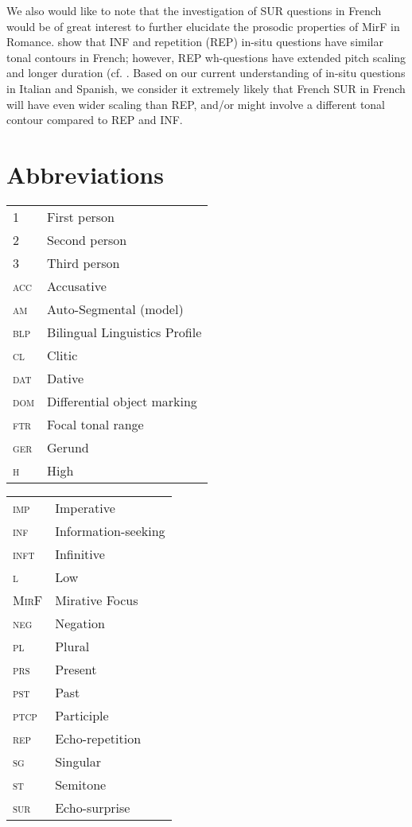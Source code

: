 \documentclass[output=paper,colorlinks,citecolor=brown,draftmode]{langscibook}
\begin{document}
We also would like to note that the investigation of SUR questions in French would be of great interest to further elucidate the prosodic properties of MirF in Romance. \citet{Glasbergen-PlasDoetjes2020} show that INF and repetition (REP) in-situ questions have similar tonal contours in French; however, REP wh-questions have extended pitch scaling and longer duration (cf. \citealp{DéprezKawahara2013,ChengRooryck2000, gryllia2016}. Based on our current understanding of in-situ questions in Italian and Spanish, we consider it extremely likely that French SUR in French will have even wider scaling than REP, and/or might involve a different tonal contour compared to REP and INF.

\largerpage[2]
\section*{Abbreviations}
\begin{tabularx}{.45\textwidth}{lQ}
1 & First person\\
2 & Second person \\
3 & Third person \\
\textsc{acc} & Accusative \\
\textsc{am} & Auto-Segmental (model) \\
\textsc{blp} & Bilingual Linguistics Profile \\
\textsc{cl} & Clitic \\
\textsc{dat} & Dative \\
\textsc{dom} & Differential object marking \\
\textsc{ftr} & Focal tonal range \\
\textsc{ger} & Gerund \\
\textsc{h} & High \\

\end{tabularx}
\begin{tabularx}{.45\textwidth}{lQ}

\textsc{imp} & Imperative \\
\textsc{inf} & Information-seeking \\
\textsc{inft} & Infinitive \\
\textsc{l} & Low\\
\textsc{MirF} & Mirative Focus \\
\textsc{neg} & Negation \\
\textsc{pl} & Plural \\
\textsc{prs} & Present \\
\textsc{pst} & Past \\
\textsc{ptcp} & Participle \\
\textsc{rep} & Echo-repetition \\
\textsc{sg} & Singular \\
\textsc{st} & Semitone \\
\textsc{sur} & Echo-surprise \\
\end{tabularx}
\end{document}
